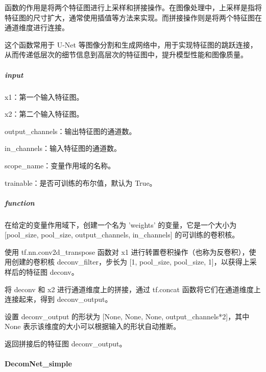 \documentclass[letterpaper,12pt]{article}
\begin{document}
		函数的作用是将两个特征图进行上采样和拼接操作。在图像处理中，上采样是指将特征图的尺寸扩大，通常使用插值等方法来实现。而拼接操作则是将两个特征图在通道维度进行连接。
		
		这个函数常用于 U-Net 等图像分割和生成网络中，用于实现特征图的跳跃连接，从而传递低层次的细节信息到高层次的特征图中，提升模型性能和图像质量。
		
		\subparagraph{input} 
		
			x1：第一个输入特征图。
			
			x2：第二个输入特征图。
			
			output\_channels：输出特征图的通道数。
			
			in\_channels：输入特征图的通道数。
			
			scope\_name：变量作用域的名称。
			
			trainable：是否可训练的布尔值，默认为 True。
		
		\subparagraph{function}
		
		在给定的变量作用域下，创建一个名为 'weights' 的变量，它是一个大小为 [pool\_size, pool\_size, output\_channels, in\_channels] 的可训练的卷积核。
		
		使用 tf.nn.conv2d\_transpose 函数对 x1 进行转置卷积操作（也称为反卷积），使用创建的卷积核 deconv\_filter，步长为 [1, pool\_size, pool\_size, 1]，以获得上采样后的特征图 deconv。
		
		将 deconv 和 x2 进行通道维度上的拼接，通过 tf.concat 函数将它们在通道维度上连接起来，得到 deconv\_output。
		
		设置 deconv\_output 的形状为 [None, None, None, output\_channels*2]，其中 None 表示该维度的大小可以根据输入的形状自动推断。
		
		返回拼接后的特征图 deconv\_output。	
		
		\paragraph{DecomNet\_simple}
		
\end{document}
